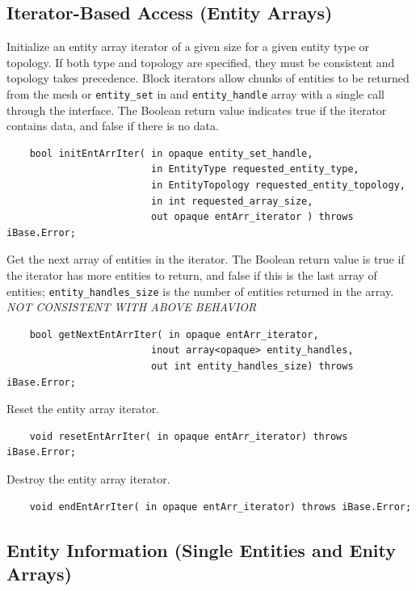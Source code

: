 \documentclass{article}
\begin{document}
\subsection{Iterator-Based Access (Entity Arrays)}

Initialize an entity array iterator of a given size for a given 
entity type or topology. If both type and topology are specified, 
they must be consistent and topology takes precedence. Block 
iterators allow chunks of entities to be returned from the mesh 
or {\tt entity\_set} in and {\tt entity\_handle} array with a single call 
through the interface. The Boolean return value indicates true 
if the iterator contains data, and false if there is no data.


\begin{verbatim}
    bool initEntArrIter( in opaque entity_set_handle, 
                         in EntityType requested_entity_type,  
                         in EntityTopology requested_entity_topology, 
                         in int requested_array_size, 
                         out opaque entArr_iterator ) throws iBase.Error;
\end{verbatim}

Get the next array of entities in the iterator. The Boolean return 
value is true if the iterator has more entities to return, and 
false if this is the last array of entities; {\tt entity\_handles\_size} 
is the number of entities returned in the array. \emph{NOT CONSISTENT 
WITH ABOVE BEHAVIOR}
\begin{verbatim} 
    bool getNextEntArrIter( in opaque entArr_iterator, 
                         inout array<opaque> entity_handles,  
                         out int entity_handles_size) throws iBase.Error;
\end{verbatim}

Reset the entity array iterator.

\begin{verbatim}
    void resetEntArrIter( in opaque entArr_iterator) throws iBase.Error;
\end{verbatim}

Destroy the entity array iterator.

\begin{verbatim}
    void endEntArrIter( in opaque entArr_iterator) throws iBase.Error;
\end{verbatim}


\subsection{Entity Information (Single Entities and Enity Arrays)}
\end{document}
